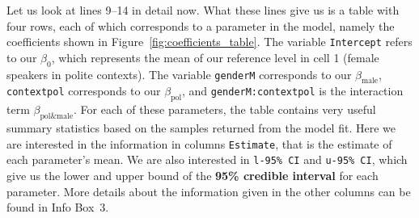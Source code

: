 \documentclass[nobib]{tufte-handout}
\begin{document}
Let us look at lines 9--14 in detail now. What these lines give us is a table with four rows, each of which corresponds to a parameter in the model, namely the coefficients shown in Figure~\ref{fig:coefficients_table}. The variable \texttt{Intercept} refers to our $\beta_0$, which represents the mean of our reference level in cell 1 (female speakers in polite contexts). The variable \texttt{genderM} corresponds to our $\beta_{\text{male}}$, \texttt{contextpol} corresponds to our $\beta_{\text{pol}}$, and \texttt{genderM:contextpol} is the interaction term $\beta_{\text{pol\&male}}$. For each of these parameters, the table contains very useful summary statistics based on the samples returned from the model fit. Here we are interested in the information in columns \texttt{Estimate}, that is the estimate of each parameter's mean. We are also interested in \texttt{l-95\% CI} and \texttt{u-95\% CI}, which give us the lower and upper bound of the \textbf{95\% credible interval} for each parameter.
%
%
More details about the information given in the other columns can be found in Info Box~3.
\end{document}
